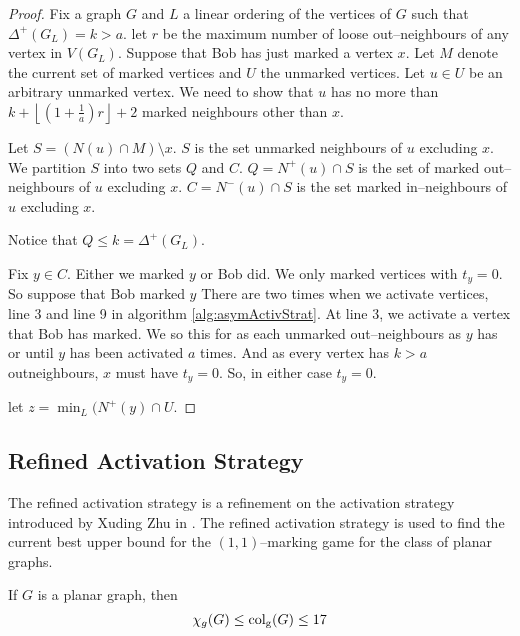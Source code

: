 \begin{proof}
%
Fix a graph $G$ and $L$ a linear ordering of the vertices of $G$ such that $\Delta^+(G_L)=k>a$. let $r$ be the maximum number of loose out--neighbours of any vertex in $V(G_L)$. Suppose that Bob has just marked a vertex $x$. Let $M$ denote the current set of marked vertices and $U$ the unmarked vertices. Let $u\in U$ be an arbitrary unmarked vertex. We need to show that $u$ has no more than  $k+\left\lfloor \left(1+\frac{1}{a}\right)r \right\rfloor +2$ marked neighbours other than $x$. 

Let $S=(N(u)\cap M) \setminus {x}$. $S$ is the set unmarked neighbours of $u$ excluding $x$. We partition $S$ into two sets $Q$ and $C$. $Q=N^+(u)\cap S$ is the set of marked out--neighbours of $u$ excluding $x$. $C=N^-(u)\cap S$ is  the set marked in--neighbours of $u$ excluding $x$.

Notice that $Q\leq k = \Delta^+(G_L)$. 

Fix $y\in C$. Either we marked $y$ or Bob did. We only marked vertices with $t_y=0$. So suppose that Bob marked $y$
There are two times when we activate vertices, line 3 and line 9 in algorithm \ref{alg:asymActivStrat}. At line 3, we activate a vertex that Bob has marked. We so this for as each unmarked out--neighbours as $y$ has or until $y$ has been activated $a$ times. And as every vertex has $k>a$ outneighbours, $x$ must have $t_y=0$.
%
So, in either case $t_y=0$.

let $z = \min_{L}(N^+(y)\cap U$. 
\end{proof}
    
    
    




\subsection{Refined Activation Strategy}\label{sec:refActStrat}
The refined activation strategy is a refinement on the activation strategy introduced by Xuding Zhu in \cite{Zhu2008}. The refined activation strategy is used to find the current best upper bound for the $(1,1)$--marking game for the class of planar graphs. 

\begin{theorem}
    If $G$ is a planar graph, then \[\chi_g(G)\leq\operatorname{col_g}(G)\leq17\]
\end{theorem}

